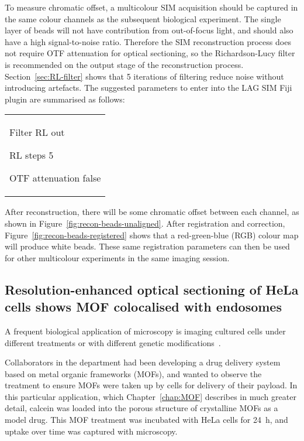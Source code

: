To measure chromatic offset, a multicolour SIM acquisition should be captured in the same colour channels as the subsequent biological experiment.
The single layer of beads will not have contribution from out-of-focus light, and should also have a high signal-to-noise ratio.
Therefore the SIM reconstruction process does not require OTF attenuation for optical sectioning, so the Richardson-Lucy filter is recommended on the output stage of the reconstruction process.
Section~\ref{sec:RL-filter} shows that 5 iterations of filtering reduce noise without introducing artefacts.
The suggested parameters to enter into the LAG SIM Fiji plugin are summarised as follows: \newline
\begin{tabular}{p{}}
\begin{labelling}[margin=OTF attenuation]
	\item[Filter] RL out
	\item[RL steps] 5
	\item[OTF attenuation] false
\end{labelling}
\end{tabular}

After reconstruction, there will be some chromatic offset between each channel, as shown in Figure~\ref{fig:recon-beads-unaligned}.
After registration and correction, Figure~\ref{fig:recon-beads-registered} shows that a red-green-blue (RGB) colour map will produce white beads.
These same registration parameters can then be used for other multicolour experiments in the same imaging session.


\subsection{Resolution-enhanced optical sectioning of HeLa cells shows MOF colocalised with endosomes} \label{sec:showcase-MOF}
A frequent biological application of microscopy is imaging cultured cells under different treatments or with different genetic modifications~\cite{white1987evaluation, specht2017critical, wang2017analysis}.

Collaborators in the department had been developing a drug delivery system based on metal organic frameworks (MOFs), and wanted to observe the treatment to ensure MOFs were taken up by cells for delivery of their payload.
In this particular application, which Chapter~\ref{chap:MOF} describes in much greater detail, calcein was loaded into the porous structure of crystalline MOFs as a model drug.
This MOF treatment was incubated with HeLa cells for \SI{24}{\hour}, and uptake over time was captured with microscopy.

